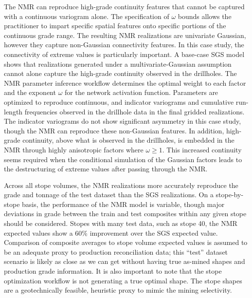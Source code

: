 The \gls{NMR} can reproduce high-grade continuity features that cannot be captured with a continuous variogram alone. The specification of $\omega$ bounds allows the practitioner to impart specific spatial features onto specific portions of the continuous grade range. The resulting \gls{NMR} realizations are univariate Gaussian, however they capture non-Gaussian connectivity features. In this case study, the connectivity of extreme values is particularly important. A base-case \gls{SGS} model shows that realizations generated under a multivariate-Gaussian assumption cannot alone capture the high-grade continuity observed in the drillholes. The \gls{NMR} parameter inference workflow determines the optimal weight to each factor and the exponent $\omega$ for the network activation function. Parameters are optimized to reproduce continuous, and indicator variograms and cumulative run-length frequencies observed in the drillhole data in the final gridded realizations. The indicator variograms do not show significant asymmetry in this case study, though the \gls{NMR} can reproduce these non-Gaussian features. In addition, high-grade continuity, above what is observed in the drillholes, is embedded in the \gls{NMR} through highly anisotropic factors where $\omega \ge 1$. This increased continuity seems required when the conditional simulation of the Gaussian factors leads to the destructuring of extreme values after passing through the \gls{NMR}.

Across all stope volumes, the \gls{NMR} realizations more accurately reproduce the grade and tonnage of the test dataset than the \gls{SGS} realizations. On a stope-by-stope basis, the performance of the \gls{NMR} model is variable, though major deviations in grade between the train and test composites within any given stope should be considered. Stopes with many test data, such as stope 40, the \gls{NMR} expected values show a 60\% improvement over the \gls{SGS} expected value. Comparison of composite averages to stope volume expected values is assumed to be an adequate proxy to production reconciliation data; this ``test'' dataset scenario is likely as close as we can get without having true as-mined shapes and production grade information. It is also important to note that the stope optimization workflow is not generating a true optimal shape. The stope shapes are a geotechnically feasible, heuristic proxy to mimic the mining selectivity.



